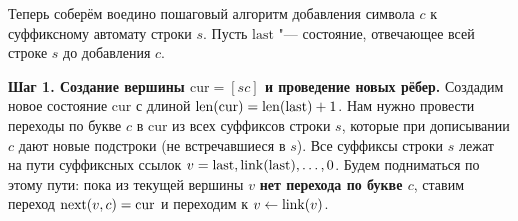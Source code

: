 Теперь соберём воедино пошаговый алгоритм добавления символа $c$ к суффиксному автомату строки $s$. Пусть $\text{last}$ "--- состояние, отвечающее всей строке $s$ до добавления $c$.

\textbf{Шаг 1. Создание вершины $\text{cur} = [sc]$ и проведение новых рёбер.}
Создадим новое состояние $\text{cur}$ с длиной $\operatorname{len}(\text{cur}) = \operatorname{len}(\text{last}) + 1$. Нам нужно провести переходы по букве $c$ в $\text{cur}$ из всех суффиксов строки $s$, которые при дописывании $c$ дают новые подстроки (не встречавшиеся в $s$). Все суффиксы строки $s$ лежат на пути суффиксных ссылок $v = \text{last}, \operatorname{link}(\text{last}), \dots, 0$. Будем подниматься по этому пути: пока из текущей вершины $v$ \textbf{нет перехода по букве $c$}, ставим переход $\operatorname{next}(v, c) = \text{cur}$ и переходим к $v \leftarrow \operatorname{link}(v)$.

